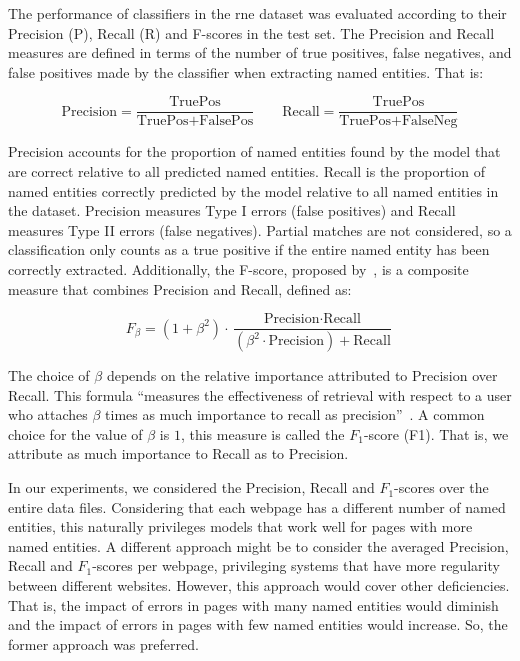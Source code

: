 \documentclass{nle}
\begin{document}
The performance of classifiers in the \gls{rne} dataset was evaluated according to their Precision (P), Recall (R) and F-scores
in the test set. The Precision and Recall 
measures are defined in terms of the number of true positives, false negatives, and false 
positives made by the classifier when extracting named entities. That is:

\begin{equation*}
\text{Precision} = \frac{\text{TruePos}}{\text{TruePos} + \text{FalsePos}}      
\qquad
\text{Recall} = \frac{\text{TruePos}}{\text{TruePos} + \text{FalseNeg}}
\end{equation*}

Precision accounts for the proportion of named entities found by the model that are 
correct relative to all predicted named entities.
Recall is the proportion of named entities correctly predicted by the model relative to
all named entities in the dataset. Precision measures Type I errors 
(false positives) and Recall measures Type II errors (false negatives). Partial matches are
not considered, so a classification only counts as a true positive if the entire named entity
has been correctly extracted. Additionally, the F-score, proposed by~\cite{Rijsbergen1979}, 
is a composite measure that combines Precision and Recall, defined as:

\begin{equation}
F_{\beta} = (1 + \beta^2) \cdot \frac{\text{Precision} \cdot \text{Recall}}{(\beta^2 \cdot \text{Precision}) + \text{Recall}}
\label{eq:fscore_formula}
\end{equation}

The choice of $ \beta $ depends on the relative importance attributed to Precision over Recall.
This formula ``measures the effectiveness of retrieval with respect to a user who attaches 
$ \beta$ times as much importance to recall as precision''~\cite{Rijsbergen1979}. A common choice
for the value of $ \beta $ is $ 1 $, this measure is called the $ F_1 $-score (F1). That is, we attribute 
as much importance to Recall as to Precision.

In our experiments, we considered the Precision, Recall and $ F_1 $-scores over the entire 
data files. Considering that each webpage has a different number of named entities,
this naturally privileges models that work well for pages with more named entities. 
A different approach might be to consider the averaged Precision, Recall and $ F_1 $-scores 
per webpage, privileging systems that have more regularity between different websites. However, 
this approach would cover other deficiencies. That is, the impact of errors in pages with many 
named entities would diminish and the impact of errors in pages with few named entities would
increase. So, the former approach was preferred.
\end{document}
